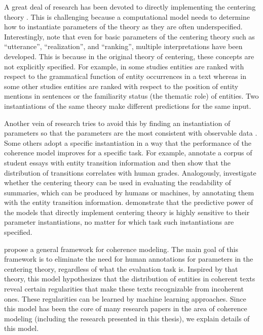 A great deal of research has been devoted to directly implementing the centering theory \cite{miltsakaki00,karamanis04a}. 
This is challenging because a computational model needs to determine how to instantiate parameters of the theory as they are often underspecified. 
Interestingly,  note that even for basic parameters of the centering theory such as ``utterance'', ``realization'', and ``ranking'', multiple interpretations have been developed.
This is because in the original theory of centering, these concepts are not explicitly specified. 
For example, in some studies entities are ranked with respect to the grammatical function of entity occurrences in a text \cite{brennan87,grosz95} whereas in some other studies entities are ranked with respect to the position of entity mentions in sentences \cite{prince81a} or the familiarity status (the thematic role) \cite{strube.cl99,moens08} of entities.  
Two instantiations of the same theory make different predictions for the same input. 

Another vein of research tries to avoid this by finding an instantiation of parameters so that the parameters are the most consistent with observable data \cite{strube.cl99,karamanis04a,poesio04b}. 
Some others adopt a specific instantiation in a way that the performance of the coherence model improves for a specific task. 
For example,  annotate a corpus of student essays with entity transition information and then show that the distribution of transitions correlates with human grades. 
Analogously,  investigate whether the centering theory can be used in evaluating the readability of summaries, which can be produced by humans or machines, by annotating them with the entity transition information. 
 demonstrate that the predictive power of the models that directly implement centering theory is highly sensitive to their parameter instantiations, no matter for which task such instantiations are specified. 

 propose a general framework for coherence modeling.  
The main goal of this framework is to eliminate the need for human annotations for parameters in the centering theory, regardless of what the evaluation task is. 
Inspired by that theory, this model hypothesizes that the distribution of entities in coherent texts reveal certain regularities that make these texts recognizable from incoherent ones. 
These regularities can be learned by machine learning approaches.  
Since this model has been the core of many research papers in the area of coherence modeling (including the research presented in this thesis), we explain details of this model.    

